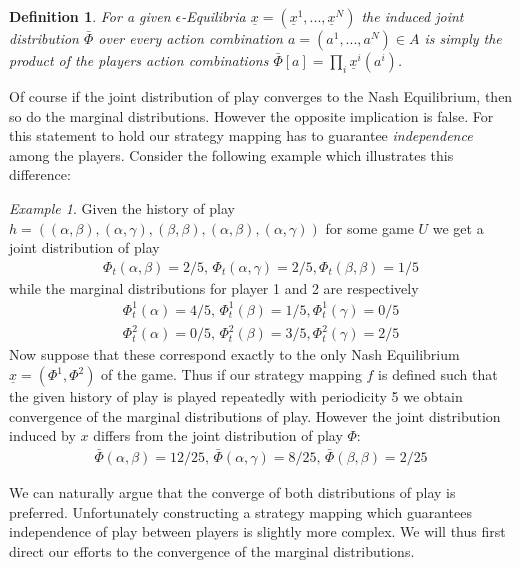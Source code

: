 \documentclass[a4paper]{article}
\theoremstyle{plain}
\newtheorem{definition}{Definition}
\theoremstyle{remark}
\newtheorem{example}{Example}
\newcommand{\eq}[1]{\underline{#1}}
\begin{document}
\begin{definition}
For a given $\epsilon$-Equilibria $\eq{x} = (\eq{x}^1, ..., \eq{x}^N)$ the \emph{induced} joint distribution $\bar{\Phi}$ over every action combination
$a = (a^1, ..., a^N) \in A$ is simply the product of the players action combinations $\bar{\Phi}[a] = \prod_i \eq{x}^i(a^i)$.
\end{definition}

Of course if the joint distribution of play converges to the Nash Equilibrium, then so do the marginal distributions.
However the opposite implication is false. For this statement to hold our strategy mapping has to 
guarantee \emph{independence} among the players.
Consider the following example which illustrates this difference:

\begin{example}
	Given the history of play $h = ((\alpha, \beta), (\alpha, \gamma), (\beta, \beta), (\alpha, \beta), (\alpha, \gamma))$
	for some game $U$ we get a joint distribution of play
	\begin{gather*}
		\Phi_t(\alpha, \beta) = 2/5, \, \Phi_t(\alpha, \gamma) = 2/5, \Phi_t(\beta, \beta) = 1/5
	\end{gather*}
	while the marginal distributions for player 1 and 2 are respectively
	\begin{gather*}
		\Phi_t^1(\alpha) = 4/5, \, \Phi_t^1(\beta) = 1/5, \Phi_t^1(\gamma) = 0/5\\
		\Phi_t^2(\alpha) = 0/5, \, \Phi_t^2(\beta) = 3/5, \Phi_t^2(\gamma) = 2/5
	\end{gather*}
	Now suppose that these correspond exactly to the only
	Nash Equilibrium $\eq{x} = (\Phi^1, \Phi^2)$ of the game. Thus if our strategy mapping $f$ is defined such that the given history of
	play is played repeatedly with periodicity 5 we obtain convergence of the marginal distributions of play.
	However the joint distribution induced by $x$ differs from the joint distribution of play $\Phi$:
	\begin{gather*}
		\bar{\Phi}(\alpha, \beta) =  12/25, \, \bar{\Phi}(\alpha, \gamma) = 8/25, \,  \bar{\Phi}(\beta, \beta) = 2/25
	\end{gather*}
\end{example}

We can naturally argue that the converge of both distributions of play is preferred. Unfortunately constructing a strategy mapping
which guarantees independence of play between players is slightly more complex. We will thus first direct our efforts to
the convergence of the marginal distributions.
\end{document}
